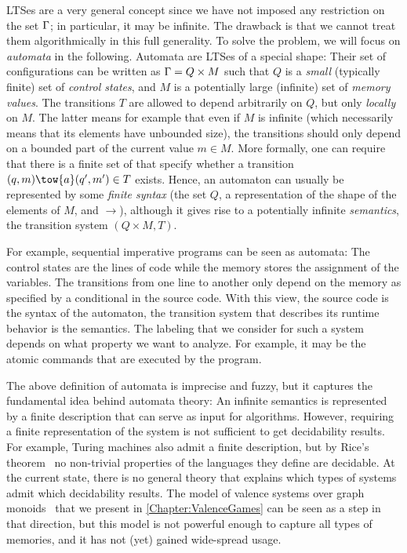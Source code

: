 \documentclass[../../diss.tex]{subfiles}
\begin{document}
LTSes are a very general concept since we have not imposed any restriction on the set $\Gamma$; in particular, it may be infinite.
The drawback is that we cannot treat them algorithmically in this full generality.
%
To solve the problem, we will focus on \emph{automata} in the following.
Automata are LTSes of a special shape:
Their set of configurations can be written as $\Gamma = Q \times M$ such that $Q$ is a \emph{small} (typically finite) set of \emph{control states}, and $M$ is a potentially large (\eg infinite) set of \emph{memory values}.
The transitions $T$ are allowed to depend arbitrarily on $Q$, but only \emph{locally} on $M$.
The latter means for example that even if $M$ is infinite (which necessarily means that its elements have unbounded size), the transitions should only depend on a bounded part of the current value $m \in M$.
More formally, one can require that there is a finite set of  that specify whether a transition $(q,m) \tow{a} (q',m') \in T$ exists.
Hence, an automaton can usually be represented by some \emph{finite syntax} (the set $Q$, a representation of the shape of the elements of $M$, and $\to$), although it gives rise to a potentially infinite \emph{semantics}, the transition system $(Q \times M, T)$.

For example, sequential imperative programs can be seen as automata:
The control states are the lines of code while the memory stores the assignment of the variables.
The transitions from one line to another only depend on the memory as specified \eg by a conditional in the source code.
With this view, the source code is the syntax of the automaton, the transition system that describes its runtime behavior is the semantics.
The labeling that we consider for such a system depends on what property we want to analyze.
For example, it may be the atomic commands that are executed by the program.

The above definition of automata is imprecise and fuzzy, but it captures the fundamental idea behind automata theory:
An infinite semantics is represented by a finite description that can serve as input for algorithms.
%
However, requiring a finite representation of the system is not sufficient to get decidability results.
For example, Turing machines also admit a finite description, but by Rice's  theorem~\cite{Rice53} no non-trivial properties of the languages they define are decidable.
At the current state, there is no general theory that explains which types of systems admit which decidability results.
The model of valence systems over graph monoids~\cite{Zetzsche15d,Charney07} that we present in \cref{Chapter:ValenceGames} can be seen as a step in that direction, but this model is not powerful enough to capture all types of memories, and it has not (yet) gained wide-spread usage.
\end{document}
